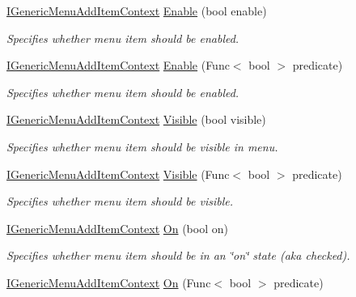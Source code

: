 \begin{DoxyCompactItemize}
\item 
\hyperlink{interface_i_generic_menu_add_item_context}{I\+Generic\+Menu\+Add\+Item\+Context} \hyperlink{interface_i_generic_menu_add_item_context_a682571e8c3fd7f58b8ae3c44fa4c1788}{Enable} (bool enable)
\begin{DoxyCompactList}\small\item\em Specifies whether menu item should be enabled. \end{DoxyCompactList}\item 
\hyperlink{interface_i_generic_menu_add_item_context}{I\+Generic\+Menu\+Add\+Item\+Context} \hyperlink{interface_i_generic_menu_add_item_context_ac97d8817141d805bb775570155634167}{Enable} (Func$<$ bool $>$ predicate)
\begin{DoxyCompactList}\small\item\em Specifies whether menu item should be enabled. \end{DoxyCompactList}\item 
\hyperlink{interface_i_generic_menu_add_item_context}{I\+Generic\+Menu\+Add\+Item\+Context} \hyperlink{interface_i_generic_menu_add_item_context_a997ba7515e31c40ecaae9a5a4a5e8b1c}{Visible} (bool visible)
\begin{DoxyCompactList}\small\item\em Specifies whether menu item should be visible in menu. \end{DoxyCompactList}\item 
\hyperlink{interface_i_generic_menu_add_item_context}{I\+Generic\+Menu\+Add\+Item\+Context} \hyperlink{interface_i_generic_menu_add_item_context_a02cbabcb5e584a278107f71f822a190d}{Visible} (Func$<$ bool $>$ predicate)
\begin{DoxyCompactList}\small\item\em Specifies whether menu item should be visible. \end{DoxyCompactList}\item 
\hyperlink{interface_i_generic_menu_add_item_context}{I\+Generic\+Menu\+Add\+Item\+Context} \hyperlink{interface_i_generic_menu_add_item_context_aa9cbeb32f7807860a29493d9a3b9d0ab}{On} (bool on)
\begin{DoxyCompactList}\small\item\em Specifies whether menu item should be in an \char`\"{}on\char`\"{} state (aka checked). \end{DoxyCompactList}\item 
\hyperlink{interface_i_generic_menu_add_item_context}{I\+Generic\+Menu\+Add\+Item\+Context} \hyperlink{interface_i_generic_menu_add_item_context_acd587887ffb0ad237341bbcae9c6c479}{On} (Func$<$ bool $>$ predicate)

\end{DoxyCompactItemize}
